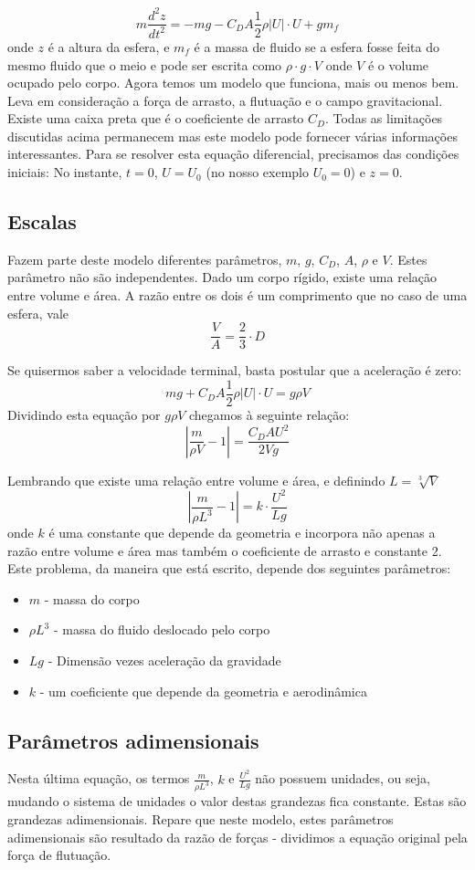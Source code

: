 \[
m \frac{d^2 z}{dt^2} = -mg - C_D A \frac{1}{2} \rho |U|\cdot U + g m_f
\]
onde $z$ é a altura da esfera, e $m_f$ é a massa de fluido se a esfera fosse feita do mesmo fluido que o meio e pode ser escrita como $\rho\cdot g \cdot V$ onde $V$ é o volume ocupado pelo corpo. Agora temos um modelo que funciona, mais ou menos bem. Leva em consideração a força de arrasto, a flutuação e o campo gravitacional. Existe uma caixa preta que é o coeficiente de arrasto $C_D$. Todas as limitações discutidas acima permanecem mas este modelo pode fornecer várias informações interessantes. Para se resolver esta equação diferencial, precisamos das condições iniciais: No instante, $t=0$, $U=U_0$ (no nosso exemplo $U_0 = 0$) e $z=0$.

\subsection{Escalas}


Fazem parte deste modelo diferentes parâmetros, $m$, $g$, $C_D$, $A$, $\rho$ e  $V$. Estes parâmetro não são independentes. Dado um corpo rígido, existe uma relação entre volume e área. A razão entre os dois é um comprimento que no caso de uma esfera, vale
\[
\frac{V}{A} = \frac{2}{3}\cdot D
\]

Se quisermos saber a velocidade terminal, basta postular que a aceleração é zero:
\[
mg + C_D A \frac{1}{2} \rho |U|\cdot U  = g \rho V
\]
Dividindo esta equação por $g \rho V$ chegamos à seguinte relação:
\[
\left| \frac{m}{\rho V} - 1 \right| = \frac{C_D A U^2}{2 V g}
\]

Lembrando que existe uma relação entre volume e área, e definindo $L = \sqrt[3]{V}$
\[
\left| \frac{m}{\rho L^3} - 1 \right| = k \cdot \frac{U^2}{L g}
\]
onde $k$ é uma constante que depende da geometria e incorpora não apenas a razão entre volume e área mas também o coeficiente de arrasto e constante 2. Este problema, da maneira que está escrito, depende dos seguintes parâmetros:

\begin{itemize}
\item $m$ - massa do corpo
\item $\rho L^3$ - massa do fluido deslocado pelo corpo
\item $Lg$ - Dimensão vezes aceleração da gravidade
\item $k$ - um coeficiente que depende da geometria e aerodinâmica
\end{itemize}

\subsection{Parâmetros adimensionais}
Nesta última equação, os termos $\frac{m}{\rho L^3}$, $k$ e $\frac{U^2}{L g}$ não possuem unidades, ou seja, mudando o sistema de unidades o valor destas grandezas fica constante. Estas são grandezas adimensionais. Repare que neste modelo, estes parâmetros adimensionais são resultado da razão de forças - dividimos a equação original pela força de flutuação.

